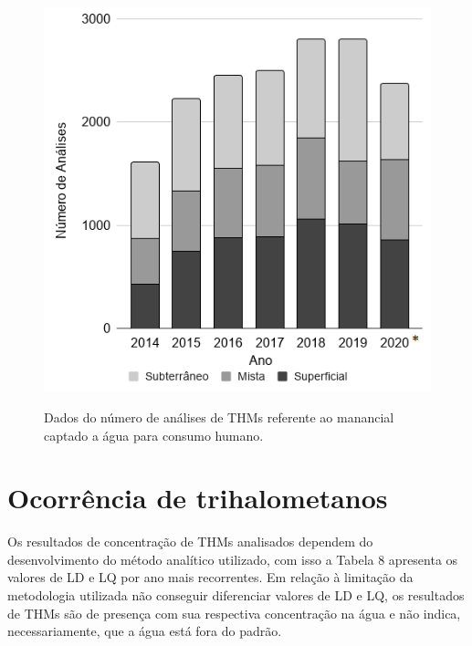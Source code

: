\begin{figure}[!htb]
\centering
\caption{\small Dados do número de análises de THMs referente ao manancial captado a água para consumo humano.}
\includegraphics[scale=0.8]{imagens/analise THMs manancial.png}
\label{fig03}
\end{figure}





\section{Ocorrência de trihalometanos}

Os resultados de concentração de THMs analisados dependem do desenvolvimento do método analítico utilizado, com isso a Tabela 8 apresenta os valores de LD e LQ por ano mais recorrentes. Em relação à limitação da metodologia utilizada não conseguir diferenciar valores de LD e LQ, os resultados de THMs são de presença com sua respectiva concentração na água e não indica, necessariamente, que a água está fora do padrão. 


